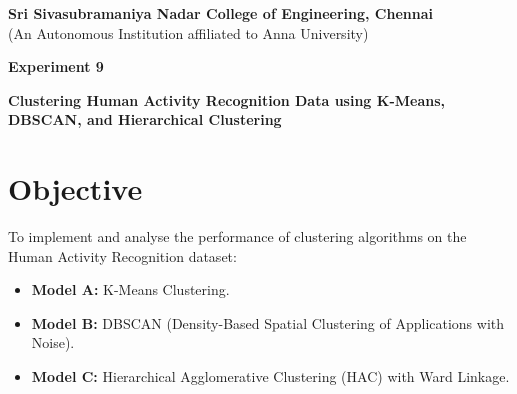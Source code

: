 \documentclass[11pt]{article}
\begin{document}
\begin{center}
    \Large \textbf{Sri Sivasubramaniya Nadar College of Engineering, Chennai} \\
    \large (An Autonomous Institution affiliated to Anna University) \\
    \vspace{0.3cm}
\end{center}

\begin{table}[h!]
\renewcommand{\arraystretch}{1.5}
\centering
{}
\end{table}

\begin{center}
    \textbf{\Large Experiment 9}
\end{center}

\begin{center}
    \textbf{Clustering Human Activity Recognition Data using K-Means, DBSCAN, and Hierarchical Clustering}
\end{center}

\section*{Objective}
To implement and analyse the performance of clustering algorithms on the Human Activity Recognition dataset:
\begin{itemize}
    \item \textbf{Model A:} K-Means Clustering.
    \item \textbf{Model B:} DBSCAN (Density-Based Spatial Clustering of Applications with Noise).
    \item \textbf{Model C:} Hierarchical Agglomerative Clustering (HAC) with Ward Linkage.
\end{itemize}
\end{document}
